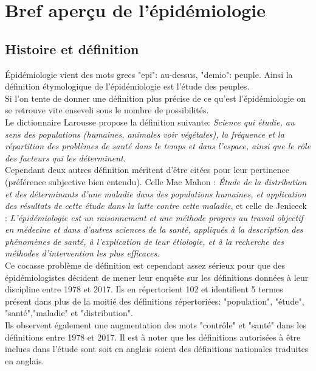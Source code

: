 \documentclass{book}
\begin{document}
\newpage
\section{Bref aperçu de l'épidémiologie}

\subsection{Histoire et définition}

\noindent
Épidémiologie vient des mots grecs "epi": au-dessus, "demio": peuple. Ainsi la définition étymologique de l'épidémiologie est l'étude des peuples.\\
Si l'on tente de donner une définition plus précise de ce qu'est l'épidémiologie on se retrouve vite enseveli sous le nombre de possibilités.\\

\noindent
Le dictionnaire Larousse propose la définition suivante: \textit{Science qui étudie, au sens des populations (humaines, animales voir végétales), la fréquence et la répartition des problèmes de santé dans le temps et dans l'espace, ainsi que le rôle des facteurs qui les déterminent}.\\

\noindent
Cependant deux autres définition méritent d'être citées pour leur pertinence (préférence subjective bien entendu). Celle Mac Mahon : \textit{Étude de la distribution et des déterminants d'une maladie dans des populations humaines, et application des résultats de cette étude dans la lutte contre cette maladie}, et celle de Jeniceck : \textit{L'épidémiologie est un raisonnement et une méthode propres au travail objectif en médecine et dans d'autres sciences de la santé, appliqués à la description des phénomènes de santé, à l'explication de leur étiologie, et à la recherche des méthodes d'intervention les plus efficaces}.\\

\noindent
Ce cocasse problème de définition est cependant assez sérieux pour que des épidémiologistes décident de mener leur enquête \cite{frerot_what_2018} sur les définitions données à leur discipline entre 1978 et 2017. Ils en répertorient 102 et identifient 5 termes présent dans plus de la moitié des définitions répertoriées: "population", "étude", "santé","maladie" et "distribution".\\
Ils observent également une augmentation des mots "contrôle" et "santé" dans les définitions entre 1978 et 2017. Il est à noter que les définitions autorisées à être inclues dans l'étude sont soit en anglais soient des définitions nationales traduites en anglais.\\
\end{document}
